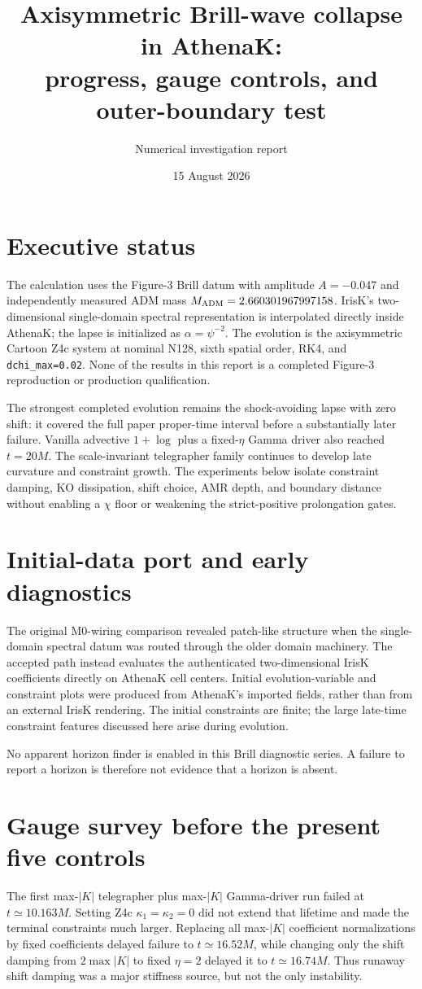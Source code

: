 \documentclass[11pt]{article}
\title{Axisymmetric Brill-wave collapse in AthenaK:\\progress, gauge controls, and outer-boundary test}
\author{Numerical investigation report}
\date{15 August 2026}
\begin{document}
\maketitle

\section{Executive status}
The calculation uses the Figure-3 Brill datum with amplitude
$A=-0.047$ and independently measured ADM mass
$M_{\rm ADM}=2.660301967997158$.  IrisK's two-dimensional single-domain
spectral representation is interpolated directly inside AthenaK; the lapse is
initialized as $\alpha=\psi^{-2}$.  The evolution is the axisymmetric Cartoon
Z4c system at nominal N128, sixth spatial order, RK4, and
\texttt{dchi\_max=0.02}.  None of the results in this report is a completed
Figure-3 reproduction or production qualification.

The strongest completed evolution remains the shock-avoiding lapse with zero
shift: it covered the full paper proper-time interval before a substantially
later failure.  Vanilla advective $1+\log$ plus a fixed-$\eta$ Gamma driver
also reached $t=20M$.  The scale-invariant telegrapher family continues to
develop late curvature and constraint growth.  The experiments below isolate
constraint damping, KO dissipation, shift choice, AMR depth, and boundary
distance without enabling a $\chi$ floor or weakening the strict-positive
prolongation gates.

\section{Initial-data port and early diagnostics}
The original M0-wiring comparison revealed patch-like structure when the
single-domain spectral datum was routed through the older domain machinery.
The accepted path instead evaluates the authenticated two-dimensional IrisK
coefficients directly on AthenaK cell centers.  Initial evolution-variable and
constraint plots were produced from AthenaK's imported fields, rather than
from an external IrisK rendering.  The initial constraints are finite; the
large late-time constraint features discussed here arise during evolution.

No apparent horizon finder is enabled in this Brill diagnostic series.  A
failure to report a horizon is therefore not evidence that a horizon is
absent.

\section{Gauge survey before the present five controls}
The first max-$|K|$ telegrapher plus max-$|K|$ Gamma-driver run failed at
$t\simeq10.163M$.  Setting Z4c $\kappa_1=\kappa_2=0$ did not extend that
lifetime and made the terminal constraints much larger.  Replacing all
max-$|K|$ coefficient normalizations by fixed coefficients delayed failure to
$t\simeq16.52M$, while changing only the shift damping from
$2\max|K|$ to fixed $\eta=2$ delayed it to $t\simeq16.74M$.  Thus runaway
shift damping was a major stiffness source, but not the only instability.
\end{document}
